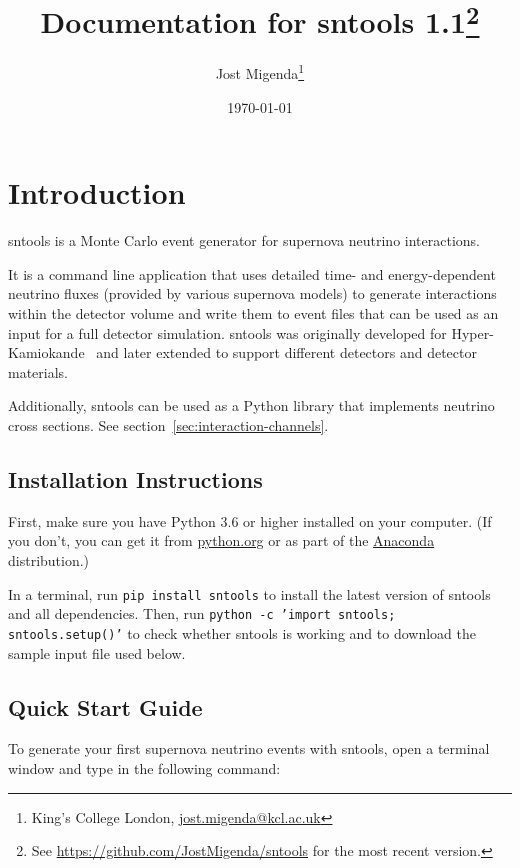 \documentclass[11pt, oneside]{article}
\title{Documentation for sntools 1.1\footnote{See \url{https://github.com/JostMigenda/sntools} for the most recent version.}}
\author{Jost Migenda\footnote{King’s College London, \url{jost.migenda@kcl.ac.uk}}}
\date{\today}
\begin{document}
\maketitle
\setcounter{tocdepth}{2}
\tableofcontents
\clearpage


\section{Introduction}

sntools is a Monte Carlo event generator for supernova neutrino interactions.

It is a command line application that uses detailed time- and energy-dependent neutrino fluxes (provided by various supernova models) to generate interactions within the detector volume and write them to event files that can be used as an input for a full detector simulation.
sntools was originally developed for Hyper-Kamiokande~\cite{Migenda2019} and later extended to support different detectors and detector materials.

Additionally, sntools can be used as a Python library that implements neutrino cross sections. See section~\ref{sec:interaction-channels}.

\subsection{Installation Instructions}

First, make sure you have Python 3.6 or higher installed on your computer.
(If you don’t, you can get it from \href{https://www.python.org}{python.org} or as part of the \href{https://www.anaconda.com/products/individual}{Anaconda} distribution.)

In a terminal, run \texttt{pip install sntools} to install the latest version of sntools and all dependencies.
Then, run \texttt{python -c 'import sntools; sntools.setup()'} to check whether sntools is working and to download the sample input file used below.


\subsection{Quick Start Guide}

To generate your first supernova neutrino events with sntools, open a terminal window and type in the following command:
\end{document}
